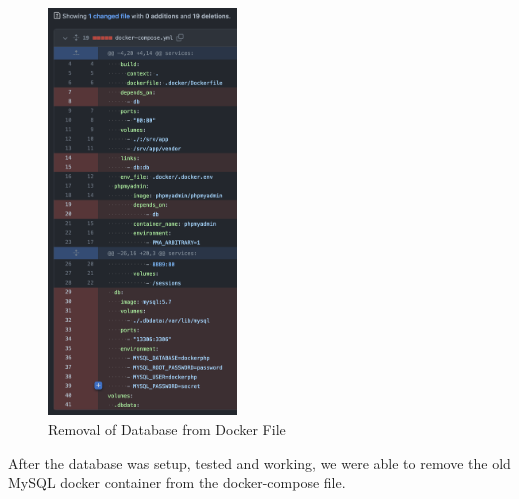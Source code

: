 \begin{figure}[!htbp]
    \centering
    \includegraphics[width=50mm]{resources/rds/docker.png}
    \caption{Removal of Database from Docker File}
    \label{fig:rds-rm-docker-compose}
\end{figure}

After the database was setup, tested and working, we were able to remove the old MySQL docker container from the docker-compose file.